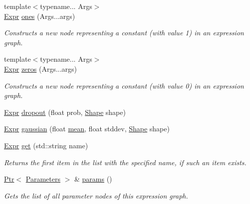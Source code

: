 \begin{DoxyCompactItemize}
{\footnotesize template$<$typename... Args$>$ }\\\hyperlink{namespacemarian_a498d8baf75b754011078b890b39c8e12}{Expr} \hyperlink{classmarian_1_1ExpressionGraph_a836f54cf0875925d01380999d6f53483}{ones} (Args...\+args)
\begin{DoxyCompactList}\small\item\em Constructs a new node representing a constant (with value 1) in an expression graph. \end{DoxyCompactList}\item 
{\footnotesize template$<$typename... Args$>$ }\\\hyperlink{namespacemarian_a498d8baf75b754011078b890b39c8e12}{Expr} \hyperlink{classmarian_1_1ExpressionGraph_a5287d5dbc9db07b0d00e5cbf58d168c3}{zeros} (Args...\+args)
\begin{DoxyCompactList}\small\item\em Constructs a new node representing a constant (with value 0) in an expression graph. \end{DoxyCompactList}\item 
\hyperlink{namespacemarian_a498d8baf75b754011078b890b39c8e12}{Expr} \hyperlink{classmarian_1_1ExpressionGraph_a187a176cd6a6b793b6b65dc1a13814e5}{dropout} (float prob, \hyperlink{structmarian_1_1Shape}{Shape} shape)
\item 
\hyperlink{namespacemarian_a498d8baf75b754011078b890b39c8e12}{Expr} \hyperlink{classmarian_1_1ExpressionGraph_a0816bd611240498f346c3557593b2538}{gaussian} (float \hyperlink{namespacemarian_a15ec9743709e47180378db974ddbf116}{mean}, float stddev, \hyperlink{structmarian_1_1Shape}{Shape} shape)
\item 
\hyperlink{namespacemarian_a498d8baf75b754011078b890b39c8e12}{Expr} \hyperlink{classmarian_1_1ExpressionGraph_a89df066a4abd34e1e999303cc53edd1e}{get} (std\+::string name)
\begin{DoxyCompactList}\small\item\em Returns the first item in the list with the specified name, if such an item exists. \end{DoxyCompactList}\item 
\hyperlink{namespacemarian_ad1a373be43a00ef9ce35666145137b08}{Ptr}$<$ \hyperlink{classmarian_1_1Parameters}{Parameters} $>$ \& \hyperlink{classmarian_1_1ExpressionGraph_a01122decdd8ff42c1c4ed519fd0222c9}{params} ()
\begin{DoxyCompactList}\small\item\em Gets the list of all parameter nodes of this expression graph. \end{DoxyCompactList}\item 

\end{DoxyCompactItemize}
